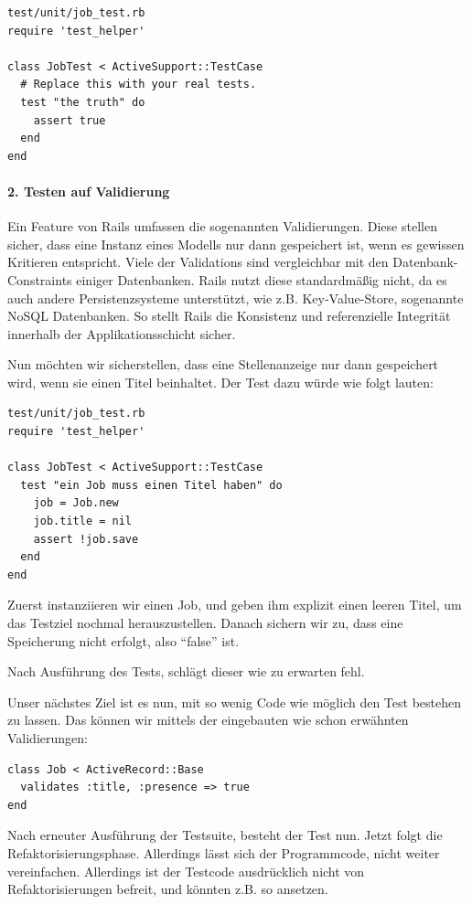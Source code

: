 \begin{lstlisting}
test/unit/job_test.rb 
require 'test_helper'

class JobTest < ActiveSupport::TestCase
  # Replace this with your real tests.
  test "the truth" do
    assert true
  end
end
\end{lstlisting}

\paragraph{2. Testen auf Validierung}

Ein Feature von Rails umfassen die sogenannten Validierungen. Diese stellen sicher, dass eine Instanz eines Modells nur dann gespeichert ist, wenn es gewissen Kritieren entspricht. Viele der Validations sind vergleichbar mit den Datenbank-Constraints einiger Datenbanken. Rails nutzt diese standardmäßig nicht, da es auch andere Persistenzsysteme unterstützt, wie z.B. Key-Value-Store, sogenannte NoSQL Datenbanken. So stellt Rails die Konsistenz und referenzielle Integrität innerhalb der Applikationsschicht sicher.

Nun möchten wir sicherstellen, dass eine Stellenanzeige nur dann gespeichert wird, wenn sie einen Titel beinhaltet. Der Test dazu würde wie folgt lauten:

\begin{lstlisting}
test/unit/job_test.rb 
require 'test_helper'

class JobTest < ActiveSupport::TestCase
  test "ein Job muss einen Titel haben" do
    job = Job.new
    job.title = nil
    assert !job.save
  end
end
\end{lstlisting}
Zuerst instanziieren wir einen Job, und geben ihm explizit einen leeren Titel, um das Testziel nochmal herauszustellen. Danach sichern wir zu, dass eine Speicherung nicht erfolgt, also "`false"' ist.

Nach Ausführung des Tests, schlägt dieser wie zu erwarten fehl.

Unser nächstes Ziel ist es nun, mit so wenig Code wie möglich den Test bestehen zu lassen. Das können wir mittels der eingebauten wie schon erwähnten Validierungen:

\begin{lstlisting}
class Job < ActiveRecord::Base
  validates :title, :presence => true
end
\end{lstlisting}

Nach erneuter Ausführung der Testsuite, besteht der Test nun. Jetzt folgt die Refaktorisierungsphase. Allerdings lässt sich der Programmcode, nicht weiter vereinfachen. Allerdings ist der Testcode ausdrücklich nicht von Refaktorisierungen befreit, und könnten z.B. so ansetzen.

